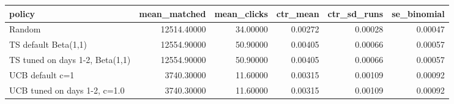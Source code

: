 \begin{tabular}{lrrrrr}
\toprule
policy & mean\_matched & mean\_clicks & ctr\_mean & ctr\_sd\_runs & se\_binomial \\
\midrule
Random & 12514.40000 & 34.00000 & 0.00272 & 0.00028 & 0.00047 \\
TS default Beta(1,1) & 12554.90000 & 50.90000 & 0.00405 & 0.00066 & 0.00057 \\
TS tuned on days 1-2, Beta(1,1) & 12554.90000 & 50.90000 & 0.00405 & 0.00066 & 0.00057 \\
UCB default c=1 & 3740.30000 & 11.60000 & 0.00315 & 0.00109 & 0.00092 \\
UCB tuned on days 1-2, c=1.0 & 3740.30000 & 11.60000 & 0.00315 & 0.00109 & 0.00092 \\
\bottomrule
\end{tabular}
